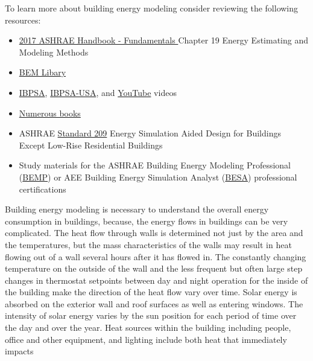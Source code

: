 To learn more about building energy modeling consider reviewing the
following resources:
\begin{itemize}
\item \href{https://www.ashrae.org/technical-resources/ashrae-handbook/description-2017-ashrae-handbook-fundamentals}{2017 ASHRAE Handbook - Fundamentals }Chapter
19 Energy Estimating and Modeling Methods
\item \href{https://www.bemlibrary.com/}{BEM Libary}
\item \href{http://www.ibpsa.org/?page_id=695}{IBPSA}, \href{https://www.ibpsa.us/videos/all}{IBPSA-USA},
and \href{https://www.youtube.com/results?search_query=building+energy+modeling}{YouTube}
videos
\item \href{https://www.amazon.com/s/ref=nb_sb_noss_2?url=search-alias\%3Daps&field-keywords=building+energy+modeling}{Numerous books}
\item ASHRAE \href{https://www.techstreet.com/ashrae/standards/ashrae-209-2018?gateway_code=ashrae&product_id=2010483}{Standard 209}
Energy Simulation Aided Design for Buildings Except Low-Rise Residential
Buildings
\item Study materials for the ASHRAE Building Energy Modeling Professional
(\href{https://www.ashrae.org/professional-development/ashrae-certification/certification-types/bemp-building-energy-modeling-professional-certification}{BEMP})
or AEE Building Energy Simulation Analyst (\href{https://www.aeecenter.org/certifications/certifications/certified-building-energy-simulation-analyst}{BESA})
professional certifications
\end{itemize}
Building energy modeling is necessary to understand the overall energy
consumption in buildings, because, the energy flows in buildings can
be very complicated. The heat flow through walls is determined not
just by the area and the temperatures, but the mass characteristics
of the walls may result in heat flowing out of a wall several hours
after it has flowed in. The constantly changing temperature on the
outside of the wall and the less frequent but often large step changes
in thermostat setpoints between day and night operation for the inside
of the building make the direction of the heat flow vary over time.
Solar energy is absorbed on the exterior wall and roof surfaces as
well as entering windows. The intensity of solar energy varies by
the sun position for each period of time over the day and over the
year. Heat sources within the building including people, office and
other equipment, and lighting include both heat that immediately impacts
